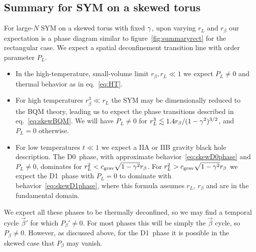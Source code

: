 \subsection{\label{sec:summaryskew}Summary for SYM on a skewed torus}
For large-$N$ SYM on a skewed torus with fixed $\gamma$, upon varying $r_L$ and $r_{\beta}$ our expectation is a phase diagram similar to figure~\ref{fig:summaryrect} for the rectangular case.
We expect a spatial deconfinement transition line with order parameter $P_L$.
\begin{itemize}
  \item In the high-temperature, small-volume limit $r_{\beta}, r_L \ll 1$ we expect $P_L \ne 0$ and thermal behavior as in eq.~\eqref{eq:HT}.
  \item For high temperatures $r_{\beta}^3 \ll r_L$ the SYM may be dimensionally reduced to the BQM theory, leading us to expect the phase transitions described in eq.~\eqref{eq:skewBQM}.
        We will have $P_L \ne 0$ for $r_L^3 \lesssim 1.4 r_{\beta} / (1 - \gamma^2)^{3 / 2}$, and $P_L = 0$ otherwise.
  \item For low temperatures $t \ll 1$ we expect a IIA or IIB gravity black hole description.
        The D0~phase, with approximate behavior~\eqref{eq:skewD0phase} and $P_L \ne 0$, dominates for $r_L^2 < c_{\text{grav}} \sqrt{1 - \gamma^2} r_{\beta}$.
        For $r_L^2 > c_{\text{grav}} \sqrt{1 - \gamma^2} r_{\beta}$ we expect the D1~phase with $P_L = 0$ to dominate with behavior~\eqref{eq:skewD1phase}, where this formula assumes $r_L$, $r_{\beta}$ and \ga are in the fundamental domain.
\end{itemize}
We expect all these phases to be thermally deconfined, so we may find a temporal cycle $\vec{\beta}'$ for which $P_{\beta}' \ne 0$.
For most phases this will be simply the $\vec{\beta}$ cycle, so $P_{\beta} \ne 0$.
However, as discussed above, for the D1~phase it is possible in the skewed case that $P_{\beta}$ may vanish.

